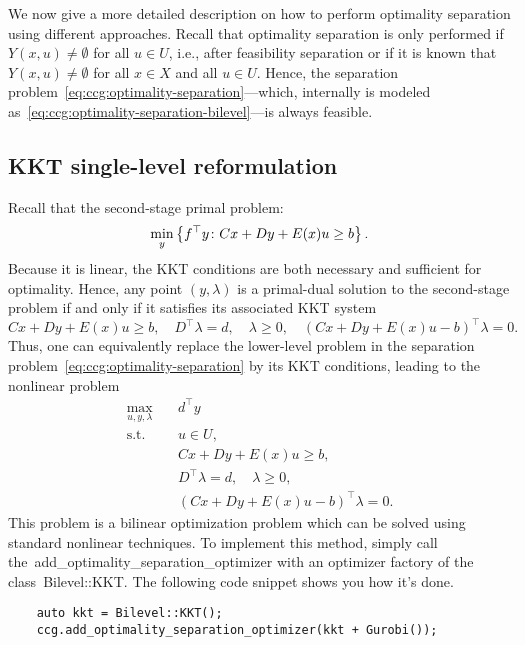 We now give a more detailed description on how to perform optimality
separation using different approaches. Recall that optimality separation is
only performed if $Y(x,u) \neq \emptyset$ for all $u\in U$, i.e., after
feasibility separation or if it is known that $Y(x,u) \neq\emptyset$ for all
$x\in X$ and all $u\in U$. Hence, the separation
problem~\eqref{eq:ccg:optimality-separation}---which, internally is modeled
as~\eqref{eq:ccg:optimality-separation-bilevel}---is always feasible.

\subsection{KKT single-level reformulation}

Recall that the second-stage primal problem:
\begin{equation*}
    \min_y\left\{ f^\top y \colon Cx + Dy + E(x)u \ge b \right\}.
\end{equation*}
Because it is linear, the KKT conditions are both necessary and sufficient for
optimality. Hence, any point $(y,\lambda)$ is a primal-dual solution to the
second-stage problem if and only if it satisfies its associated KKT system
\begin{equation*}
    Cx + Dy + E(x)u \ge b, \quad 
    D^\top \lambda = d, \quad 
    \lambda\ge 0, \quad
    (Cx + Dy + E(x)u - b)^\top \lambda = 0.
\end{equation*}
Thus, one can equivalently replace the lower-level problem in the separation
problem~\eqref{eq:ccg:optimality-separation} by its KKT conditions, leading to
the nonlinear problem
\begin{subequations}
    \begin{align}
        \max_{u,y,\lambda} \quad & d^\top y \\
        \text{s.t.} \quad & u\in U, \\
        & Cx + Dy + E(x)u \ge b, \\ 
        & D^\top \lambda = d, \quad \lambda\ge 0, \\
        & (Cx + Dy + E(x)u - b)^\top \lambda = 0. \label{eq:ccg:kkt}
    \end{align}
\end{subequations}
This problem is a bilinear optimization problem which can be solved using
standard nonlinear techniques.
%
To implement this method, simply call
the~\textsf{add\_optimality\_separation\_optimizer} with an optimizer factory
of the class~\textsf{Bilevel::KKT}. The following code snippet shows you how
it's done.
%
\begin{lstlisting}
    auto kkt = Bilevel::KKT();
    ccg.add_optimality_separation_optimizer(kkt + Gurobi());
\end{lstlisting}

